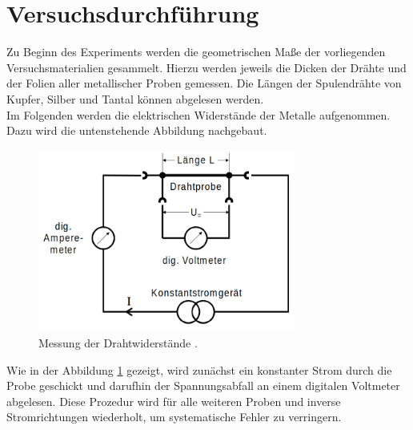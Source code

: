 




\section{Versuchsdurchführung}
\label{sec:Versuchsdurchfuehrung}

Zu Beginn des Experiments werden die geometrischen Maße der vorliegenden Versuchsmaterialien gesammelt. Hierzu 
werden jeweils die Dicken der Drähte und der Folien aller metallischer Proben gemessen. Die Längen der Spulendrähte
von Kupfer, Silber und Tantal können abgelesen werden.\\

\noindent Im Folgenden werden die elektrischen Widerstände der Metalle aufgenommen. Dazu wird die untenstehende Abbildung 
nachgebaut.

\begin{figure}
    \centering
    \includegraphics[height=6cm]{Widerstand.png}
    \caption{Messung der Drahtwiderstände \cite{Versuchsanleitung_v511}.}
    \label{fig:Widerstand}
\end{figure}

\noindent Wie in der Abbildung \ref{fig:Widerstand} gezeigt, wird zunächst ein konstanter Strom durch die Probe geschickt
und darufhin der Spannungsabfall an einem digitalen Voltmeter abgelesen. Diese Prozedur wird für alle weiteren Proben und 
inverse Stromrichtungen wiederholt, um systematische Fehler zu verringern.\\

